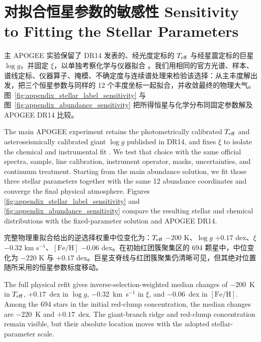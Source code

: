 \appendix

\section{对拟合恒星参数的敏感性 Sensitivity to Fitting the Stellar Parameters}
\label{app:stellar_label_sensitivity}

主 APOGEE 实验保留了 DR14 发表的、经光度定标的 $T_{\rm eff}$ 与经星震定标的巨星 $\log g$，并固定 $\xi$，以单独考察化学与仪器拟合 \citep{Holtzman2018}。我们用相同的官方光谱、样本、谱线定标、仪器算子、掩模、不确定度与连续谱处理来检验该选择：从主丰度解出发，把三个恒星参数与同样的 12 个丰度坐标一起拟合，并收敛最终的物理大气。图~\ref{fig:appendix_stellar_label_sensitivity} 与图~\ref{fig:appendix_abundance_sensitivity} 把所得恒星与化学分布同固定参数解及 APOGEE DR14 比较。

\begin{EN}
The main APOGEE experiment retains the photometrically calibrated $T_{\rm eff}$
and asteroseismically calibrated giant $\log g$ published in DR14, and fixes
$\xi$ to isolate the chemical and instrumental fit \citep{Holtzman2018}. We
test that choice with the same official spectra, sample, line calibration,
instrument operator, masks, uncertainties, and continuum treatment. Starting
from the main abundance solution, we fit those three stellar parameters
together with the same 12 abundance coordinates and converge the final physical
atmosphere. Figures
\ref{fig:appendix_stellar_label_sensitivity} and
\ref{fig:appendix_abundance_sensitivity} compare the resulting stellar and
chemical distributions with the fixed-parameter solution and APOGEE DR14.
\end{EN}

完整物理重拟合给出的逆选择权重中位变化为：$T_{\rm eff}$ $-200$ K、$\log g$ $+0.17$ dex、$\xi$ $-0.32$ km s$^{-1}$、$[\mathrm{Fe}/\mathrm{H}]$ $-0.06$ dex。在初始红团簇聚集区的 694 颗星中，中位变化为 $-220$ K 与 $+0.17$ dex。巨星支脊线与红团簇聚集仍清晰可见，但其绝对位置随所采用的恒星参数标度移动。

\begin{EN}
The full physical refit gives inverse-selection-weighted median changes of
$-200$~K in $T_{\rm eff}$,
$+0.17$~dex in $\log g$, $-0.32$~km~s$^{-1}$ in $\xi$, and $-0.06$~dex in
$[\mathrm{Fe}/\mathrm{H}]$. Among the 694 stars in the initial red-clump
concentration, the median changes are $-220$~K and $+0.17$~dex. The giant-branch
ridge and red-clump concentration remain visible, but their absolute location
moves with the adopted stellar-parameter scale.
\end{EN}


